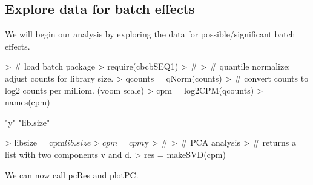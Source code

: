 \documentclass{article}
\begin{document}
\subsection{Explore data for batch effects}
We will begin our analysis by exploring the data for possible/significant batch effects.

\begin{Schunk}
\begin{Sinput}
> # load batch package
> require(cbcbSEQ1)
> #
> # quantile normalize: adjust counts for library size.
> qcounts = qNorm(counts)
> # convert counts to log2 counts per milliom. (voom scale)
> cpm = log2CPM(qcounts)
> names(cpm)
\end{Sinput}
\begin{Soutput}
[1] "y"        "lib.size"
\end{Soutput}
\begin{Sinput}
> libsize = cpm$lib.size
> cpm = cpm$y
> #
> # PCA analysis
> # returns a list with two components v and d.
> res = makeSVD(cpm)
\end{Sinput}
\end{Schunk}
We can now call pcRes and plotPC.
\end{document}
